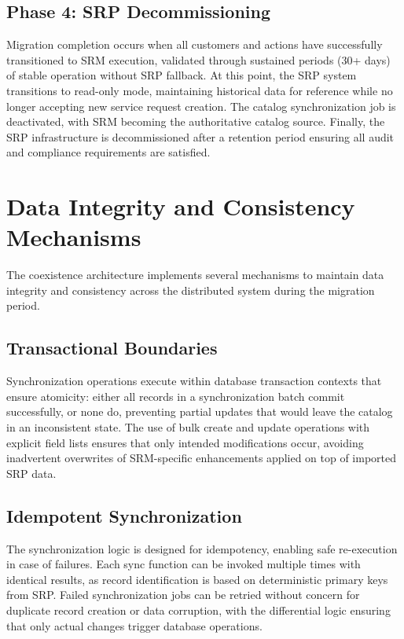 \subsection{Phase 4: SRP Decommissioning}

Migration completion occurs when all customers and actions have successfully transitioned to SRM execution, validated through sustained periods (30+ days) of stable operation without SRP fallback. At this point, the SRP system transitions to read-only mode, maintaining historical data for reference while no longer accepting new service request creation. The catalog synchronization job is deactivated, with SRM becoming the authoritative catalog source. Finally, the SRP infrastructure is decommissioned after a retention period ensuring all audit and compliance requirements are satisfied.

\section{Data Integrity and Consistency Mechanisms}

The coexistence architecture implements several mechanisms to maintain data integrity and consistency across the distributed system during the migration period.

\subsection{Transactional Boundaries}

Synchronization operations execute within database transaction contexts that ensure atomicity: either all records in a synchronization batch commit successfully, or none do, preventing partial updates that would leave the catalog in an inconsistent state. The use of bulk create and update operations with explicit field lists ensures that only intended modifications occur, avoiding inadvertent overwrites of SRM-specific enhancements applied on top of imported SRP data.

\subsection{Idempotent Synchronization}

The synchronization logic is designed for idempotency, enabling safe re-execution in case of failures. Each sync function can be invoked multiple times with identical results, as record identification is based on deterministic primary keys from SRP. Failed synchronization jobs can be retried without concern for duplicate record creation or data corruption, with the differential logic ensuring that only actual changes trigger database operations.

